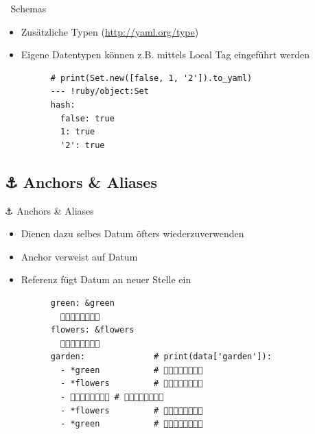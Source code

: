 \documentclass{beamer}
\newcommand{\code}[1]{
  \codebox{\texttt|#1|}
}
\begin{document}
\begin{frame}{🍳 Schemas}
  \newpage
  \begin{itemize}
    \item Zusätzliche Typen (\textcolor{orange}{\url{http://yaml.org/type}})
    \item Eigene Datentypen können z.B. mittels Local Tag eingeführt werden
    \begin{verbatim}
      # print(Set.new([false, 1, '2']).to_yaml)
      --- !ruby/object:Set
      hash:
        false: true
        1: true
        '2': true
    \end{verbatim}
  \end{itemize}
\end{frame}

\subsection{⚓️ Anchors \& Aliases}

\begin{frame}[fragile]{⚓️ Anchors \& Aliases}
  \begin{itemize}
    \item Dienen dazu selbes Datum öfters wiederzuverwenden
    \item Anchor \code{&name} verweist auf Datum
    \item Referenz \code{*name} fügt Datum an neuer Stelle ein
    \begin{verbatim}
      green: &green
        🌳🌱🌿🌱🌿🌱🌿🌳
      flowers: &flowers
        🌳🌸🌼🌻🌺🌼🌸🌳
      garden:              # print(data['garden']):
        - *green           # 🌳🌱🌿🌱🌿🌱🌿🌳
        - *flowers         # 🌳🌸🌼🌻🌺🌼🌸🌳
        - 🌳🌱🐞🌱🌱🐛🌱🌳 # 🌳🌱🐞🌱🌱🐛🌱🌳
        - *flowers         # 🌳🌸🌼🌻🌺🌼🌸🌳
        - *green           # 🌳🌱🌿🌱🌿🌱🌿🌳
    \end{verbatim}
  \end{itemize}
\end{frame}
\end{document}
